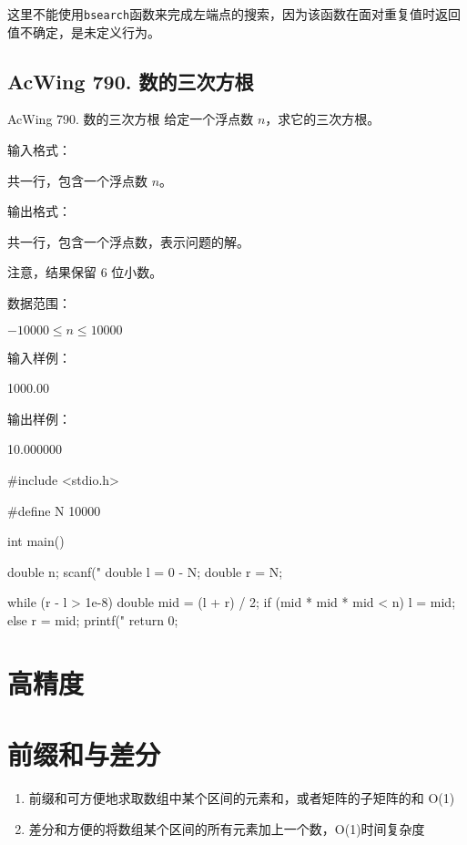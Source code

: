 \begin{exclamation}
    这里不能使用\lstinline{bsearch}函数来完成左端点的搜索，因为该函数在面对重复值时返回值不确定，是未定义行为。
\end{exclamation}

\subsection{AcWing 790. 数的三次方根}
\begin{titledbox}{AcWing 790. 数的三次方根}
    给定一个浮点数 $n$，求它的三次方根。

    输入格式：

    共一行，包含一个浮点数 $n$。

    输出格式：

    共一行，包含一个浮点数，表示问题的解。
    
    注意，结果保留 $6$ 位小数。
    
    数据范围：

    $-10000 \le n \le 10000$
    
    输入样例：
    
    1000.00
    
    输出样例：

    10.000000
\end{titledbox}

\begin{mycpptwocol}[数的三次方根]
#include <stdio.h>

#define N 10000

int main()
{
    double n;
    scanf("%
    double l = 0 - N;
    double r = N;

    while (r - l > 1e-8) {
        double mid = (l + r) / 2;
        if (mid * mid * mid < n) {
            l = mid;
        } else {
            r = mid;
        }
    }
    printf("%
    return 0;
}
\end{mycpptwocol}

\section{高精度}

\section{前缀和与差分}
\begin{enumerate}
    \item 前缀和可方便地求取数组中某个区间的元素和，或者矩阵的子矩阵的和 O(1)
    \item 差分和方便的将数组某个区间的所有元素加上一个数，O(1)时间复杂度
\end{enumerate}

